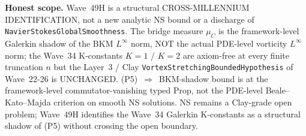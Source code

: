 \begin{remark}
\textbf{Honest scope.} Wave~49H is a structural CROSS-MILLENNIUM IDENTIFICATION, not a new analytic NS bound or a discharge of \texttt{NavierStokesGlobalSmoothness}. The bridge measure $\mu_C$ is the framework-level Galerkin shadow of the BKM $L^\infty$ norm, NOT the actual PDE-level vorticity $L^\infty$ norm; the Wave~34 K-constants $K = 1$ / $K = 2$ are axiom-free at every finite truncation $n$ but the Layer~3 / Clay \texttt{VortexStretchingBoundedHypothesis} of Wave~22-26 is UNCHANGED. (P5)~$\Rightarrow$~BKM-shadow bound is at the framework-level commutator-vanishing typed Prop, not the PDE-level Beale--Kato--Majda criterion on smooth NS solutions. NS remains a Clay-grade open problem; Wave~49H identifies the Wave~34 Galerkin K-constants as a structural shadow of (P5) without crossing the open boundary.
\end{remark}

